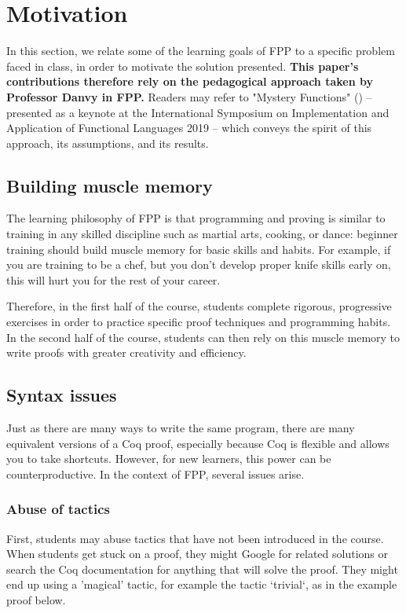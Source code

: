 
\chapter{Motivation} %

\label{motivation} %
In this section, we relate some of the learning goals of FPP to a specific problem faced in class, in order to motivate the solution presented. \textbf{This paper's contributions therefore rely on the pedagogical approach taken by Professor Danvy in FPP.} Readers may refer to "Mystery Functions" (\cite{Danvy2020}) – presented as a keynote at the International Symposium on Implementation and Application of Functional Languages 2019 – which conveys the spirit of this approach, its assumptions, and its results.

\section{Building muscle memory}
The learning philosophy of FPP is that programming and proving is similar to training in any skilled discipline such as martial arts, cooking, or dance: beginner training should build muscle memory for basic skills and habits. For example, if you are training to be a chef, but you don’t develop proper knife skills early on, this will hurt you for the rest of your career.

Therefore, in the first half of the course, students complete rigorous, progressive exercises in order to practice specific proof techniques and programming habits. In the second half of the course, students can then rely on this muscle memory to write proofs with greater creativity and efficiency.

\section{Syntax issues}
Just as there are many ways to write the same program, there are many equivalent versions of a Coq proof, especially because Coq is flexible and allows you to take shortcuts. However, for new learners, this power can be counterproductive. In the context of FPP, several issues arise.


\subsection{Abuse of tactics}
\label{abuse-of-tactics}
First, students may abuse tactics that have not been introduced in the course. When students get stuck on a proof, they might Google for related solutions or search the Coq documentation for anything that will solve the proof. They might end up using a 'magical' tactic, for example the tactic ‘trivial‘, as in the example proof below.

